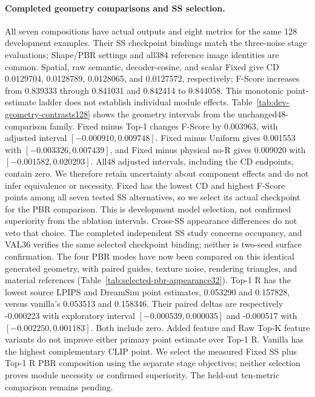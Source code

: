 \documentclass[10pt]{article}
\begin{document}
\paragraph{Completed geometry comparisons and SS selection.}
All seven compositions have actual outputs and eight metrics for the same
128 development examples. Their SS checkpoint bindings match the three-noise
stage evaluations; Shape/PBR settings and all384 reference image identities
are common. Spatial, raw semantic, decoder-cosine, and scalar Fixed give CD
0.0129704, 0.0128789, 0.0128065, and 0.0127572, respectively; F-Score increases
from 0.839333 through 0.841031 and 0.842414 to 0.844058.
This monotonic point-estimate ladder does not establish individual module effects.
Table~\ref{tab:dev-geometry-contrasts128} shows the geometry intervals from the
unchanged48-comparison family. Fixed minus Top-1 changes F-Score by 0.003963,
with adjusted interval $[-0.000910,0.009748]$. Fixed minus Uniform gives
0.001553 with $[-0.003326,0.007439]$, and Fixed minus physical no-R gives
0.009020 with $[-0.001582,0.020293]$. All48 adjusted intervals, including
the CD endpoints, contain zero. We therefore retain uncertainty about
component effects and do not infer equivalence or necessity.
Fixed has the lowest CD and highest F-Score points among all seven tested SS
alternatives, so we select its actual checkpoint for the PBR comparison.
This is development model selection, not confirmed superiority from the
ablation intervals. Cross-SS appearance differences do not veto that choice.
The completed independent SS study concerns occupancy, and VAL36 verifies
the same selected checkpoint binding; neither is two-seed surface confirmation.
The four PBR modes have now been compared on this identical generated geometry,
with paired guides, texture noise, rendering triangles, and material references
(Table~\ref{tab:selected-pbr-appearance32}). Top-1 R has the lowest source
LPIPS and DreamSim point estimates, 0.053290 and 0.157828, versus vanilla's
0.053513 and 0.158346. Their paired deltas are respectively -0.000223 with
exploratory interval $[-0.000539,0.000035]$ and -0.000517 with
$[-0.002250,0.001183]$. Both include zero. Added feature and Raw Top-K feature
variants do not improve either primary point estimate over Top-1 R.
Vanilla has the highest complementary CLIP point. We select the measured
Fixed SS plus Top-1 R PBR composition using the separate stage objectives;
neither selection proves module necessity or confirmed superiority.
The held-out ten-metric comparison remains pending.


\end{document}
